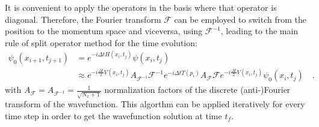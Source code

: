 \documentclass[pra, onecolumn, notitlepage, floats, 11pt]{revtex4-1}
\begin{document}
It is convenient to apply the operators in the basis where that operator is diagonal. Therefore, the Fourier transform \( \mathcal{F} \) can be employed to switch from the position to the momentum space and viceversa, using \( \mathcal{F}^{-1} \), leading to the main rule of split operator method for the time evolution:
\begin{align}
    \psi_{0}(x_{i+1},t_{j+1})
    &=
    e^{-i \Delta t H(x_{i},t_{j})} \psi (x_{i},t_{j}) \nonumber \\
    &\approx
    e^{- i \frac{\Delta t}{2} V(x_{i},t_{j})}
    A_{\mathcal{F}^{-1}}\mathcal{F}^{-1}
    e^{- i \Delta t T(p_{i})} A_{\mathcal{F}}\mathcal{F}
    e^{- i \frac{\Delta t}{2} V(x_{i},t_{j})}
    \psi_{0}(x_{i},t_{j})
    \quad .
    \label{eq:07_T_5}
\end{align}
with \( A_{\mathcal{F}} = A_{\mathcal{F}^{-1}} = \frac{1}{\sqrt{N_{x}+1}} \) normalization factors of the discrete (anti-)Fourier transform of the wavefunction. This algorthm can be applied iteratively for every time step in order to get the wavefunction solution at time \( t_{f} \).
\end{document}
